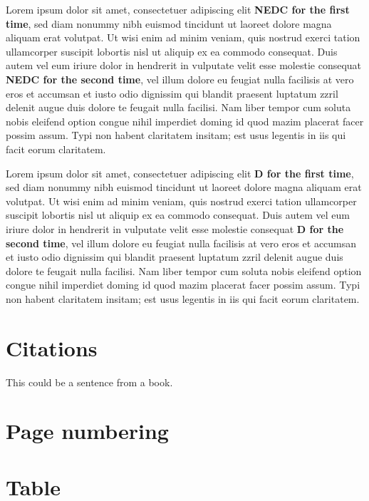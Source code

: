 Lorem ipsum dolor sit amet, consectetuer adipiscing elit \textbf{\gls{NEDC} for the first time}, sed diam nonummy nibh euismod tincidunt ut laoreet dolore magna aliquam erat volutpat. Ut wisi enim ad minim veniam, quis nostrud exerci tation ullamcorper suscipit lobortis nisl ut aliquip ex ea commodo consequat. Duis autem vel eum iriure dolor in hendrerit in vulputate velit esse molestie consequat \textbf{\gls{NEDC} for the second time}, vel illum dolore eu feugiat nulla facilisis at vero eros et accumsan et iusto odio dignissim qui blandit praesent luptatum zzril delenit augue duis dolore te feugait nulla facilisi. Nam liber tempor cum soluta nobis eleifend option congue nihil imperdiet doming id quod mazim placerat facer possim assum. Typi non habent claritatem insitam; est usus legentis in iis qui facit eorum claritatem. 

Lorem ipsum dolor sit amet, consectetuer adipiscing elit \textbf{\gls{D} for the first time}, sed diam nonummy nibh euismod tincidunt ut laoreet dolore magna aliquam erat volutpat. Ut wisi enim ad minim veniam, quis nostrud exerci tation ullamcorper suscipit lobortis nisl ut aliquip ex ea commodo consequat. Duis autem vel eum iriure dolor in hendrerit in vulputate velit esse molestie consequat \textbf{\gls{D} for the second time}, vel illum dolore eu feugiat nulla facilisis at vero eros et accumsan et iusto odio dignissim qui blandit praesent luptatum zzril delenit augue duis dolore te feugait nulla facilisi. Nam liber tempor cum soluta nobis eleifend option congue nihil imperdiet doming id quod mazim placerat facer possim assum. Typi non habent claritatem insitam; est usus legentis in iis qui facit eorum claritatem. 

\chapter{Citations}

This could be a sentence from a book.\cite{wagner2010}

\chapter{Page numbering}



\chapter{Table}

